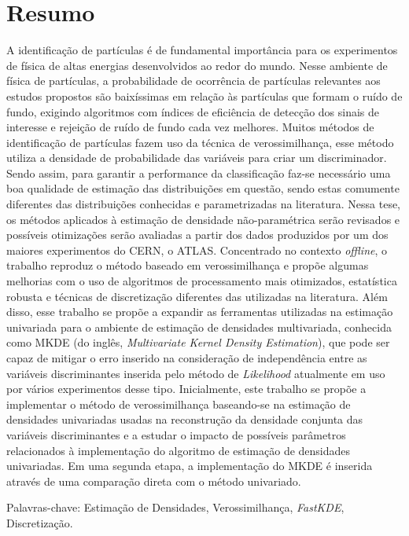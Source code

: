 %
%
\chapter*{Resumo}


\noindent A identificação de partículas é de fundamental importância para os experimentos de física de altas energias desenvolvidos ao redor do mundo. Nesse ambiente de física de partículas, a probabilidade de ocorrência de  partículas relevantes aos estudos propostos são baixíssimas em relação às partículas que formam o ruído de fundo, exigindo algoritmos com índices de eficiência de detecção dos sinais de interesse e rejeição de ruído de fundo cada vez melhores. Muitos métodos de identificação de partículas fazem uso da técnica de verossimilhança, esse método utiliza a densidade de probabilidade das variáveis para criar um discriminador. Sendo assim, para garantir a performance da classificação faz-se necessário uma boa qualidade de estimação das distribuições em questão, sendo estas comumente diferentes das distribuições conhecidas e parametrizadas na literatura. Nessa tese, os métodos aplicados à estimação de densidade não-paramétrica serão revisados e possíveis otimizações serão avaliadas a partir dos dados produzidos por um dos maiores experimentos do CERN, o ATLAS. Concentrado no contexto \emph{offline}, o trabalho reproduz o método baseado em verossimilhança e propõe algumas melhorias com o uso de algoritmos de processamento mais otimizados, estatística robusta e técnicas de discretização diferentes das utilizadas na literatura. Além disso, esse trabalho se propõe a expandir as ferramentas utilizadas na estimação univariada para o ambiente de estimação de densidades multivariada, conhecida como MKDE (do inglês, \emph{Multivariate Kernel Density Estimation}), que pode ser capaz de mitigar o erro inserido na consideração de independência entre as variáveis discriminantes inserida pelo método de \emph{Likelihood} atualmente em uso por vários experimentos desse tipo. Inicialmente, este trabalho se propõe a implementar o método de verossimilhança baseando-se na estimação de densidades univariadas usadas na reconstrução da densidade conjunta das variáveis discriminantes e a estudar o impacto de possíveis parâmetros relacionados à implementação do algoritmo de estimação de densidades univariadas. Em uma segunda etapa, a implementação do MKDE é inserida através de uma comparação direta com o método univariado.

\vspace{0.5cm}

\noindent Palavras-chave: Estimação de Densidades, Verossimilhança, \textit{FastKDE}, Discretização. \\

\newpage



